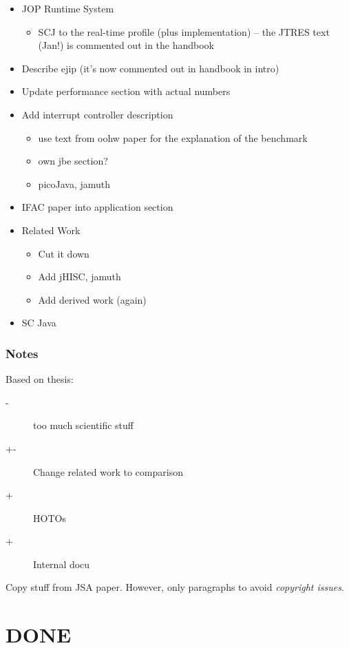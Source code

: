 \begin{itemize}
    \item JOP Runtime System
    \begin{itemize}
        \item SCJ to the real-time profile (plus implementation) --
        the JTRES text (Jan!) is commented out in the handbook
    \end{itemize}
    \item Describe ejip (it's now commented out in handbook in intro)
    \item Update performance section with actual numbers
    \item Add interrupt controller description
    \begin{itemize}
        \item use text from oohw paper for
    the explanation of the benchmark
        \item own jbe section?
        \item picoJava, jamuth
    \end{itemize}
    \item IFAC paper into application section
    \item Related Work
    \begin{itemize}
        \item Cut it down
        \item Add jHISC, jamuth
        \item Add derived work (again)
    \end{itemize}
    \item SC Java
\end{itemize}

\subsection{Notes}

Based on thesis:
\begin{description}
    \item[-] too much scientific stuff
    \item[+-] Change related work to comparison
    \item[+] HOTOs
    \item[+] Internal docu
\end{description}

Copy stuff from JSA paper. However, only paragraphs to avoid
\emph{copyright issues}.

\chapter{DONE}

